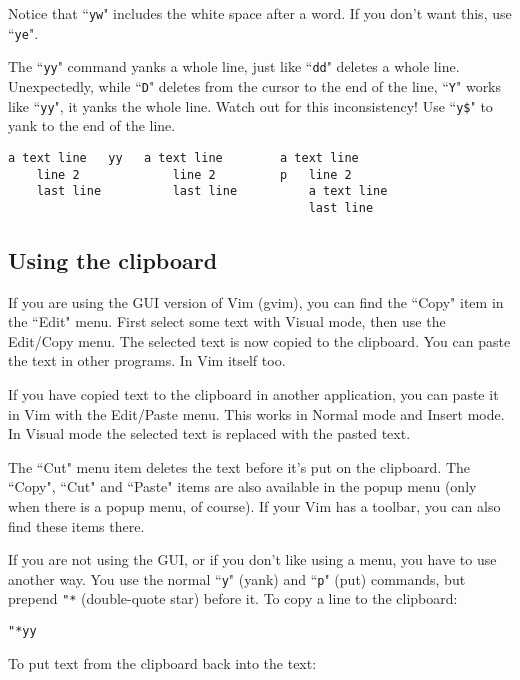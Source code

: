 Notice that ``\texttt{yw}" includes the white space after a word.
If you don't want this, use ``\texttt{ye}".

The ``\texttt{yy}" command yanks a whole line, just like ``\texttt{dd}" deletes a whole line.
Unexpectedly, while ``\texttt{D}" deletes from the cursor to the end of the line, ``\texttt{Y}" works like ``\texttt{yy}", it yanks the whole line.
Watch out for this inconsistency!  Use ``\texttt{y\$}" to yank to the end of the line.

		\begin{Verbatim}[samepage=true]
    a text line   yy   a text line        a text line
    line 2             line 2         p   line 2
    last line          last line          a text line
                                          last line
		\end{Verbatim}

\subsection{Using the clipboard}
\label{Using the clipboard}

If you are using the GUI version of Vim (gvim), you can find the ``Copy" item in the ``Edit" menu.
First select some text with Visual mode, then use the Edit/Copy menu.
The selected text is now copied to the clipboard.
You can paste the text in other programs.
In Vim itself too.

If you have copied text to the clipboard in another application, you can paste it in Vim with the Edit/Paste menu.
This works in Normal mode and Insert mode.
In Visual mode the selected text is replaced with the pasted text.

The ``Cut" menu item deletes the text before it's put on the clipboard.
The ``Copy", ``Cut" and ``Paste" items are also available in the popup menu (only when there is a popup menu, of course).
If your Vim has a toolbar, you can also find these items there.

If you are not using the GUI, or if you don't like using a menu, you have to use another way.
You use the normal ``\texttt{y}" (yank) and ``\texttt{p}" (put) commands, but prepend \texttt{"*} (double-quote star) before it.
To copy a line to the clipboard:

 \begin{Verbatim}[samepage=true]
 "*yy
 \end{Verbatim}

To put text from the clipboard back into the text:

